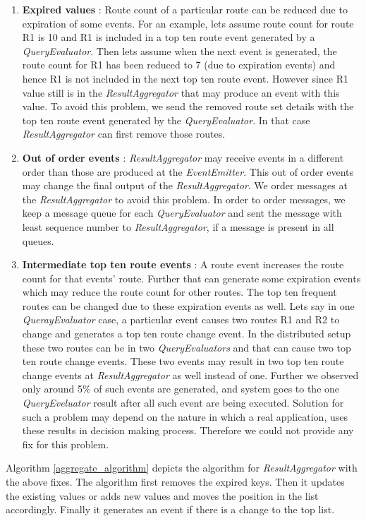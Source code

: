 \begin{enumerate}
	\item \textbf{Expired values} : Route count of a particular route can be reduced due to expiration of some events. For an example, lets assume route count for route R1 is 10 and R1 is included in a top ten route event generated by a \textit{QueryEvaluator}. Then lets assume when the next event is generated, the route count for R1 has been reduced to 7 (due to expiration events) and hence R1 is not included in the next top ten route event. However since R1 value still is in the \textit{ResultAggregator} that may produce an event with this value. To avoid this problem, we send the removed route set details with the top ten route event generated by the \textit{QueryEvaluator}. In that case \textit{ResultAggregator} can first remove those routes.
	\item \textbf{Out of order events} : \textit{ResultAggregator} may receive events in a different order than those are produced at the \textit{EventEmitter}. This out of order events may change the final output of the \textit{ResultAggregator}. We order messages at the \textit{ResultAggregator} to avoid this problem. In order to order messages, we keep a message queue for each \textit{QueryEvaluator} and sent the message with least sequence number to \textit{ResultAggregator},  if a message is present in all queues. 
	\item \textbf{Intermediate top ten route events} : A route event increases the route count for that events' route. Further that can generate some expiration events which may reduce the route count for other routes. The top ten frequent routes can be changed due to these expiration events as well. Lets say in one \textit{QuerayEvaluator} case, a particular event causes two routes R1 and R2 to change and generates a top ten route change event. In the distributed setup these two routes can be in two \textit{QueryEvaluators} and that can cause two top ten route change events. These two events may result in two top ten route change events at \textit{ResultAggregator} as well instead of one. Further we observed only around 5\% of such events are generated, and system goes to the one \textit{QueryEveluator} result after all such event are being executed. Solution for such a problem may depend on the nature in which a real application, uses these results in decision making process. Therefore we could not provide any fix for this problem.
\end{enumerate}

Algorithm \ref{aggregate_algorithm} depicts the algorithm for \textit{ResultAggregator} with the above fixes. The algorithm first removes the expired keys. Then it updates the existing values or adds new values and moves the position in the list accordingly. Finally it generates an event if there is a change to the top list.


